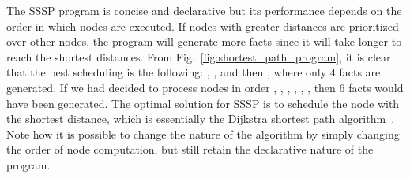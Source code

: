 The SSSP program is concise and declarative but its performance depends on the
order in which nodes are executed. If nodes with greater distances are
prioritized over other nodes, the program will generate more  facts
since it will take longer to reach the shortest distances. From
Fig.~\ref{fig:shortest_path_program}, it is clear that the best scheduling is
the following: , ,  and then , where only 4
 facts are generated. If we had decided to process nodes in order
, , , , , , then 6
 facts would have been generated.  The optimal solution for SSSP is
to schedule the node with the shortest distance, which is essentially the
Dijkstra shortest path algorithm~\cite{Dijkstra}. Note how it is possible to
change the nature of the algorithm by simply changing the order of node
computation, but still retain the declarative nature of the program.

